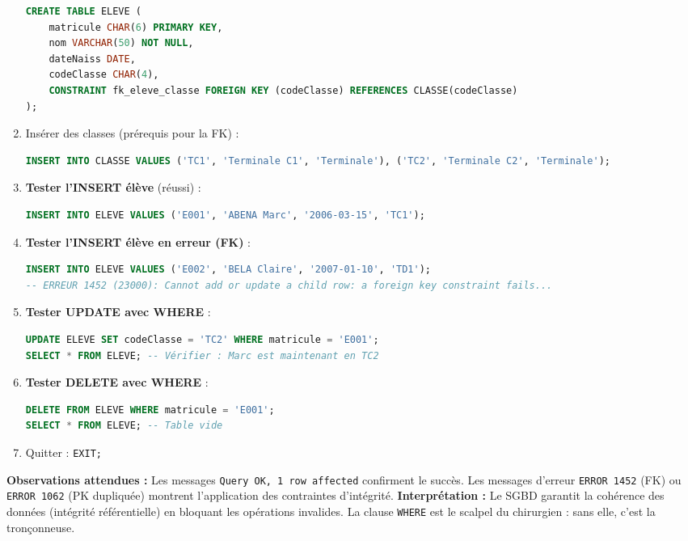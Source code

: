 \documentclass[11pt]{article}
\begin{document}
\begin{experience}
\begin{enumerate}
\begin{lstlisting}[language=SQL]
CREATE TABLE ELEVE (
    matricule CHAR(6) PRIMARY KEY,
    nom VARCHAR(50) NOT NULL,
    dateNaiss DATE,
    codeClasse CHAR(4),
    CONSTRAINT fk_eleve_classe FOREIGN KEY (codeClasse) REFERENCES CLASSE(codeClasse)
);
\end{lstlisting}
    \item Insérer des classes (prérequis pour la FK) :
\begin{lstlisting}[language=SQL]
INSERT INTO CLASSE VALUES ('TC1', 'Terminale C1', 'Terminale'), ('TC2', 'Terminale C2', 'Terminale');
\end{lstlisting}
    \item \textbf{Tester l'INSERT élève} (réussi) :
\begin{lstlisting}[language=SQL]
INSERT INTO ELEVE VALUES ('E001', 'ABENA Marc', '2006-03-15', 'TC1');
\end{lstlisting}
    \item \textbf{Tester l'INSERT élève en erreur (FK)} :
\begin{lstlisting}[language=SQL]
INSERT INTO ELEVE VALUES ('E002', 'BELA Claire', '2007-01-10', 'TD1');
-- ERREUR 1452 (23000): Cannot add or update a child row: a foreign key constraint fails...
\end{lstlisting}
    \item \textbf{Tester UPDATE avec WHERE} :
\begin{lstlisting}[language=SQL]
UPDATE ELEVE SET codeClasse = 'TC2' WHERE matricule = 'E001';
SELECT * FROM ELEVE; -- Vérifier : Marc est maintenant en TC2
\end{lstlisting}
    \item \textbf{Tester DELETE avec WHERE} :
\begin{lstlisting}[language=SQL]
DELETE FROM ELEVE WHERE matricule = 'E001';
SELECT * FROM ELEVE; -- Table vide
\end{lstlisting}
    \item Quitter : \texttt{EXIT;}
\end{enumerate}
\textbf{Observations attendues :} Les messages \texttt{Query OK, 1 row affected} confirment le succès. Les messages d'erreur \texttt{ERROR 1452} (FK) ou \texttt{ERROR 1062} (PK dupliquée) montrent l'application des contraintes d'intégrité.
\textbf{Interprétation :} Le SGBD garantit la cohérence des données (intégrité référentielle) en bloquant les opérations invalides. La clause \texttt{WHERE} est le scalpel du chirurgien : sans elle, c'est la tronçonneuse.
\end{experience}
\end{document}
